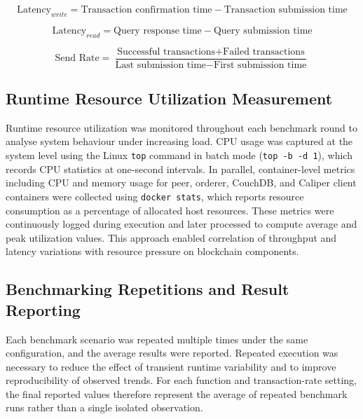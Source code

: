 \documentclass[12pt]{article}
\begin{document}
	\begin{equation}
		\text{Latency}_{write} = \text{Transaction confirmation time} - \text{Transaction submission time}
	\end{equation}
	
	\begin{equation}
		\text{Latency}_{read} = \text{Query response time} - \text{Query submission time}
	\end{equation}
	
	\begin{equation}
		\text{Send Rate} = \frac{\text{Successful transactions} + \text{Failed transactions}}{\text{Last submission time} - \text{First submission time}}
	\end{equation}
	
	\subsection{Runtime Resource Utilization Measurement}
	
	Runtime resource utilization was monitored throughout each benchmark round to analyse system behaviour under increasing load. CPU usage was captured at the system level using the Linux \texttt{top} command in batch mode (\texttt{top -b -d 1}), which records CPU statistics at one-second intervals. In parallel, container-level metrics including CPU and memory usage for peer, orderer, CouchDB, and Caliper client containers were collected using \texttt{docker stats}, which reports resource consumption as a percentage of allocated host resources. These metrics were continuously logged during execution and later processed to compute average and peak utilization values. This approach enabled correlation of throughput and latency variations with resource pressure on blockchain components.
	
	
	\subsection{Benchmarking Repetitions and Result Reporting}
	
	Each benchmark scenario was repeated multiple times under the same configuration, and the average results were reported. Repeated execution was necessary to reduce the effect of transient runtime variability and to improve reproducibility of observed trends. For each function and transaction-rate setting, the final reported values therefore represent the average of repeated benchmark runs rather than a single isolated observation.
	
\end{document}
